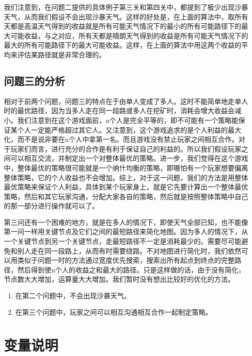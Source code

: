 \documentclass[withoutpreface,bwprint]{cumcmthesis} %
\begin{document}
我们注意到，在问题二提供的具体例子第三关和第四关中，都提到了极少出现沙暴天气，从而我们假设不会出现沙暴天气。这样的好处是，在上面的算法中，取所有天都是高温天气得到的收益就是所有可能天气情况下的最小的所有可能路径下的最大可能收益，与之对应，所有天都是晴朗天气得到的收益是所有可能天气情况下的最大的所有可能路径下的最大可能收益。这样，在上面的算法中用这两个收益的平均来评估某路径就是非常合理的。

\subsection{问题三的分析}
相对于前两个问题，问题三的特点在于由单人变成了多人。这时不能简单地走单人时的最优路径，因为当多人走在同一段路或多人在挖矿时，消耗会增大收益会减小。我们注意到在这个游戏面前，n个人是完全平等的，即不可能有一个策略能保证某个人一定能严格超过其它人。又注意到，这个游戏追求的是个人利益的最大化，而不是说非要在n个人中拿第一名。而且游戏没有禁止玩家之间相互合作。对于玩家们而言，进行充分的合作是有利于保证自己的利益的。所以我们假设玩家之间可以相互交流，并制定出一个对整体最优的策略。进一步，我们觉得在这个游戏中，整体最优的策略很可能就是一个纳什均衡的策略，即哪怕有一个玩家想要偏离整体策略，它的个人收益也不会增加。综上，对于这一问题，我们的方法是用整体最优策略来保证个人利益，具体到某个玩家身上，就是它先要计算出一个整体最优策略，然后和其它玩家沟通，分配大家各自的策略，然后就是按照整体策略中自己的那一部分进行操作就可以了。

第三问还有一个困难的地方，就是在多人的情况下，即使天气全部已知，也不能像第一问一样用关键节点及它们之间的最短路径来简化地图。因为多人的情况下，从一个关键节点到另一个关键节点，走最短路径不一定是消耗最少的。需要尽可能避免和别人走在同一段路上，从而有时需要绕路。不对地图进行简化时，我们依然可以用类似于问题一时的方法通过宽度优先搜索，搜索出所有起点到终点的完整路径，然后得到使n个人的收益之和最大的路径。只是这样做的话，由于没有简化，节点数大大增加，运算量大大增加。我们暂时没有想出比较好的优化的方法。


\begin{enumerate}
    \item 在第二个问题中，不会出现沙暴天气。
    \item 在第三个问题中，玩家之间可以相互沟通相互合作一起制定策略。
\end{enumerate}

\section{变量说明}
\end{document}
